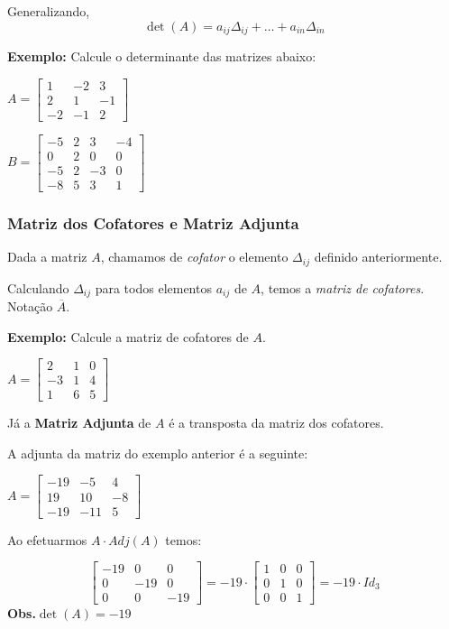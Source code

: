 \documentclass[oneside,a4paper,12pt]{article}
\begin{document}
Generalizando,
$$\det(A)=a_{ij}\Delta_{ij}+\dots+a_{in}\Delta_{in}$$

\textbf{Exemplo: }Calcule o determinante das matrizes abaixo:
\begin{multicols}{2}
$A=\left[
\begin{array}{ccc}
1	&	-2	&	3	\\
2	&	1	&	-1	\\
-2	&	-1	&	2
\end{array}
\right]
$

$B=\left[
\begin{array}{cccc}
-5	&	2	&	3	&	-4	\\
0	&	2	&	0	&	0	\\
-5	&	2	&	-3	&	0	\\
-8	&	5	&	3	&	1
\end{array}
\right]
$
\end{multicols}
\newpage

\subsubsection{Matriz dos Cofatores e Matriz Adjunta}

Dada a matriz $A$, chamamos de {\it cofator} o elemento $\Delta_{ij}$ definido anteriormente.

Calculando $\Delta_{ij}$ para todos elementos $a_{ij}$ de $A$, temos a {\it matriz de cofatores}. Notação $\overline{A}$.

\textbf{Exemplo: }Calcule a matriz de cofatores de $A$.

$A=\left[
\begin{array}{ccc}
2	&	1	&	0	\\
-3	&	1	&	4	\\
1	&	6	&	5
\end{array}
\right]
$

\vspace{250pt}

Já a {\bf Matriz Adjunta} de $A$ é a transposta da matriz dos cofatores.

A adjunta da matriz do exemplo anterior é a seguinte:

$A=\left[
\begin{array}{ccc}
-19	&	-5	&	4	\\
19	&	10	&	-8	\\
-19	&	-11	&	5
\end{array}
\right]
$

Ao efetuarmos $A \cdot Adj(A)$ temos:

$$
\left[
\begin{array}{ccc}
-19	&	0	&	0	\\
0	&	-19	&	0	\\
0	&	0	&	-19
\end{array}
\right]
=
-19\cdot
\left[
\begin{array}{ccc}
1	&	0	&	0	\\
0	&	1	&	0	\\
0	&	0	&	1
\end{array}
\right]
=
-19\cdot Id_3
$$
\textbf{Obs.}$\det(A)=-19$
\end{document}
